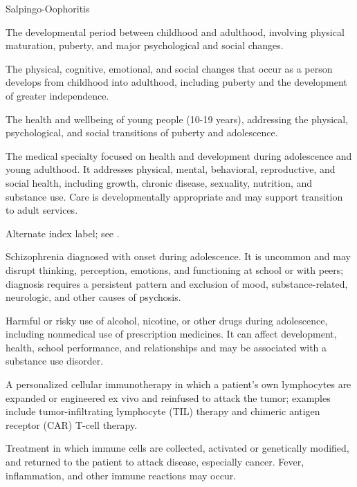 \synonyms
Salpingo-Oophoritis

 The developmental period between childhood and adulthood, involving physical maturation, puberty, and major psychological and social changes.

 The physical, cognitive, emotional, and social changes that occur as a person develops from childhood into adulthood, including puberty and the development of greater independence.

 The health and wellbeing of young people (10-19 years), addressing the physical,
psychological, and social transitions of puberty and adolescence.

 The medical specialty focused on health and development during
adolescence and young adulthood. It addresses physical, mental, behavioral, reproductive,
and social health, including growth, chronic disease, sexuality, nutrition, and substance
use. Care is developmentally appropriate and may support transition to adult services.

 Alternate index label; see .

 Schizophrenia diagnosed with onset during adolescence. It is uncommon and may disrupt thinking, perception, emotions, and functioning at school or with peers; diagnosis requires a persistent pattern and exclusion of mood, substance-related, neurologic, and other causes of psychosis.

 Harmful or risky use of alcohol, nicotine, or other drugs
during adolescence, including nonmedical use of prescription medicines. It can affect
development, health, school performance, and relationships and may be associated with a
substance use disorder.

 A personalized cellular immunotherapy in which a patient's own lymphocytes are expanded
or engineered ex vivo and reinfused to attack the tumor; examples include
tumor-infiltrating lymphocyte (TIL) therapy and chimeric antigen receptor (CAR) T-cell
therapy.

 Treatment in which immune cells are collected, activated or genetically modified, and returned to the patient to attack disease, especially cancer. Fever, inflammation, and other immune reactions may occur.

